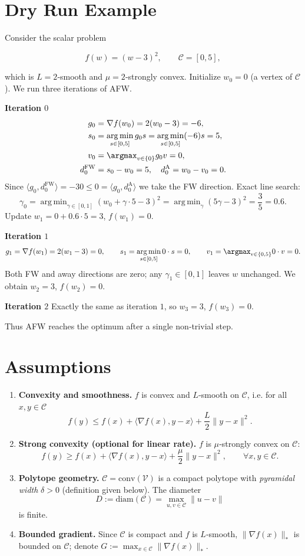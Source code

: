 \documentclass{article}
\newcommand{\argmin}{\mathop{\mathrm{arg\,min}}}
\newcommand{\diam}{\mathrm{diam}}
\newcommand{\conv}{\mathrm{conv}}
\begin{document}
\section*{Dry Run Example}
Consider the scalar problem  

\[
f(w)=(w-3)^2,\qquad \mathcal C=[0,5],
\]

which is $L=2$‑smooth and $ \mu=2$‑strongly convex.
Initialize $w_0=0$ (a vertex of $\mathcal C$).  
We run three iterations of AFW.

\medskip
\noindent\textbf{Iteration $0$}
\[
\begin{aligned}
g_0&=\nabla f(w_0)=2(w_0-3)=-6,\\
s_0&=\argmin_{s\in[0,5]} g_0 s = \argmin_{s\in[0,5]}(-6)s =5,\\
v_0&=\argmax_{v\in\{0\}} g_0 v =0,\\
d^{\mathrm{FW}}_0&=s_0-w_0=5, \quad
d^{\mathrm{A}}_0=w_0-v_0=0.
\end{aligned}
\]
Since $\langle g_0,d^{\mathrm{FW}}_0\rangle=-30 \le 0=\langle g_0,d^{\mathrm{A}}_0\rangle$ we take the FW direction.
Exact line search:
\[
\gamma_0 = \argmin_{\gamma\in[0,1]} (w_0+\gamma\cdot5-3)^2
       =\argmin_{\gamma}(5\gamma-3)^2
       =\frac{3}{5}=0.6 .
\]
Update  
$w_1 = 0 + 0.6\cdot5 = 3$,   $f(w_1)=0$.

\medskip
\noindent\textbf{Iteration $1$}
\[
g_1 = \nabla f(w_1)=2(w_1-3)=0,\qquad
s_1 = \argmin_{s\in[0,5]} 0\cdot s =0,\qquad
v_1 = \argmax_{v\in\{0,5\}}0\cdot v =0 .
\]
Both FW and away directions are zero; any $\gamma_1\in[0,1]$ leaves $w$ unchanged.
We obtain $w_2=3$, $f(w_2)=0$.

\medskip
\noindent\textbf{Iteration $2$}
Exactly the same as iteration $1$, so $w_3=3$, $f(w_3)=0$.

Thus AFW reaches the optimum after a single non‑trivial step.

\newpage
\section*{Assumptions}
\begin{enumerate}
\item \textbf{Convexity and smoothness.} $f$ is convex and $L$‑smooth on $\mathcal C$,
i.e. for all $x,y\in\mathcal C$
\[
f(y)\le f(x)+\langle\nabla f(x),y-x\rangle+\frac{L}{2}\|y-x\|^2 .
\tag{A1}
\]
\item \textbf{Strong convexity (optional for linear rate).} $f$ is $\mu$‑strongly convex on $\mathcal C$:
\[
f(y)\ge f(x)+\langle\nabla f(x),y-x\rangle+\frac{\mu}{2}\|y-x\|^2 ,
\qquad\forall x,y\in\mathcal C .
\tag{A2}
\]
\item \textbf{Polytope geometry.} $\mathcal C=\conv(\mathcal V)$ is a compact polytope with
\emph{pyramidal width} $\delta>0$ (definition given below). The diameter
\[
D:=\diam(\mathcal C)=\max_{u,v\in\mathcal C}\|u-v\|
\tag{A3}
\]
is finite.
\item \textbf{Bounded gradient.} Since $\mathcal C$ is compact and $f$ is $L$‑smooth,
$\|\nabla f(x)\|_*$ is bounded on $\mathcal C$; denote $G:=\max_{x\in\mathcal C}\|\nabla f(x)\|_*$.
\end{enumerate}
\end{document}
